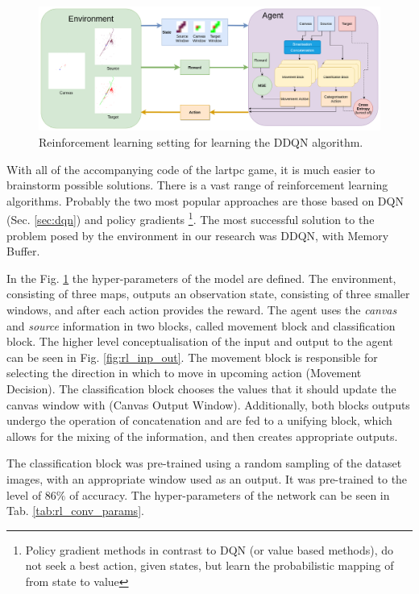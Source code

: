 \begin{figure}
  \centering
  \includegraphics[width=\textwidth]{figures/chapter7/lartpc_rl_flow.png}
  \caption{Reinforcement learning setting for learning the DDQN algorithm.}
  \label{fig:settings}
\end{figure}

With all of the accompanying code of the lartpc game, it is much easier to brainstorm possible solutions.
There is a vast range of reinforcement learning algorithms. Probably the two most popular approaches are those based on DQN (Sec. \ref{sec:dqn}) and policy gradients \footnote{
Policy gradient methods in contrast to DQN (or value based methods), do not seek a best action, given states, but learn the probabilistic mapping of from state to value}.
The most successful solution to the problem posed by the environment in our research was DDQN, with Memory Buffer.

In the Fig. \ref{fig:settings} the hyper-parameters of the model are defined.
The environment, consisting of three maps, outputs an observation state, consisting of three smaller windows, and after each action provides the reward.
The agent uses the \textit{canvas} and \textit{source} information in two blocks, called movement block and classification block.
The higher level conceptualisation of the input and output to the agent can be seen in Fig. \ref{fig:rl_inp_out}.
The movement block is responsible for selecting the direction in which to move in upcoming action (Movement Decision).
The classification block chooses the values that it should update the canvas window with (Canvas Output Window).
Additionally, both blocks outputs undergo the operation of concatenation and are fed to a unifying block, which allows for the mixing of the information, and then creates appropriate outputs.

The classification block was pre-trained using a random sampling of the dataset images, with an appropriate window used as an output. It was pre-trained to the level of $86\%$ of accuracy. The hyper-parameters of the network can be seen in Tab. \ref{tab:rl_conv_params}.

